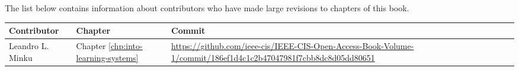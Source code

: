 
\contributors

The list below contains information about contributors who have made large revisions to chapters of this book.

\begin{tabularx}{\textwidth}{|l|l|X|} \hline
Contributor & Chapter & Commit \\ \hline
Leandro L. Minku & Chapter \ref{chp:into-learning-systems} & \url{https://github.com/ieee-cis/IEEE-CIS-Open-Access-Book-Volume-1/commit/186ef1d4c1c2b47047981f7cbb8dc8d05dd80651} \\ \hline
\end{tabularx}
